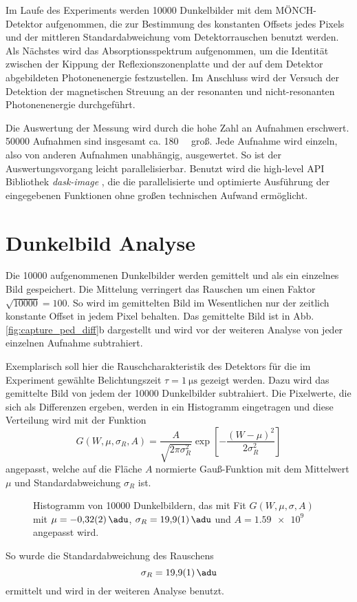 \noindent
Im Laufe des Experiments werden \num{10000} Dunkelbilder mit dem MÖNCH-Detektor aufgenommen, die zur Bestimmung des konstanten Offsets jedes Pixels und der mittleren Standardabweichung vom Detektorrauschen benutzt werden. Als Nächstes wird das Absorptionsspektrum aufgenommen, um die Identität zwischen der Kippung der Reflexionszonenplatte und der auf dem Detektor abgebildeten Photonenenergie festzustellen. Im Anschluss wird der Versuch der Detektion der magnetischen Streuung an der resonanten und nicht-resonanten Photonenenergie durchgeführt.   

\noindent
Die Auswertung der Messung wird durch die hohe Zahl an Aufnahmen erschwert. \num{50000} Aufnahmen sind insgesamt ca. \qty{180}{\giga\byte} groß. Jede Aufnahme wird einzeln, also von anderen Aufnahmen unabhängig, ausgewertet. So ist der Auswertungsvorgang leicht parallelisierbar. Benutzt wird die high-level API Bibliothek \textit{dask-image} \cite{dask-library}, die die parallelisierte und optimierte Ausführung der eingegebenen Funktionen ohne großen technischen Aufwand ermöglicht.

\section{Dunkelbild Analyse}
Die \num{10000} aufgenommenen Dunkelbilder werden gemittelt und als ein einzelnes Bild gespeichert. Die Mittelung verringert das Rauschen um einen Faktor $\sqrt{10000} = 100$. So wird im gemittelten Bild im Wesentlichen nur der zeitlich konstante Offset in jedem Pixel behalten. Das gemittelte Bild ist in Abb. \ref{fig:capture_ped_diff}b dargestellt und wird vor der weiteren Analyse von jeder einzelnen Aufnahme subtrahiert.

\noindent
Exemplarisch soll hier die Rauschcharakteristik des Detektors für die im Experiment gewählte Belichtungszeit $\tau = \SI{1}{\micro\second}$ gezeigt werden. Dazu wird das gemittelte Bild von jedem der \num{10000} Dunkelbilder subtrahiert. Die Pixelwerte, die sich als Differenzen ergeben, werden in ein Histogramm eingetragen und diese Verteilung wird mit der Funktion
\begin{equation}
    G(W, \mu, \sigma_R, A) = \frac{A}{\sqrt{2\pi \sigma_R^2}}\exp\left[-\frac{(W - \mu)^2}{2\sigma_R^2}\right]
    \label{eq:gauss_funktion}
\end{equation}
angepasst, welche auf die Fläche $A$ normierte Gauß-Funktion mit dem Mittelwert $\mu$ und Standardabweichung $\sigma_R$ ist.
\begin{figure}[H]
    \centering
    
    \caption{Histogramm von \num{10000} Dunkelbildern, das mit Fit $G(W,\mu,\sigma, A)$ mit $\mu= \SI{-0.32(2)}{\adu}$, $\sigma_R = \SI{19.9(1)}{\adu}$ und $A = \num{1.59e9}$ angepasst wird.}
    \label{fig:noise_hist_fit}
\end{figure}
\noindent
So wurde die Standardabweichung des Rauschens
\begin{equation}
    \sigma_R = \SI{19.9(1)}{\adu}
    \label{eq:sigma_r}
\end{equation}
ermittelt und wird in der weiteren Analyse benutzt.

